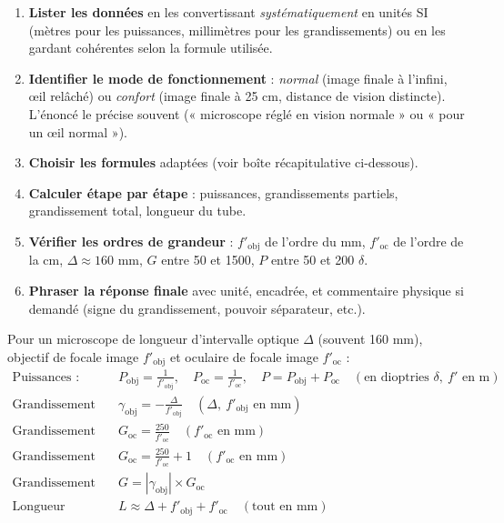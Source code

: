 \documentclass[11pt]{article}
\begin{document}
\begin{methode}
\begin{enumerate}
    \item \textbf{Lister les données} en les convertissant \emph{systématiquement} en unités SI (mètres pour les puissances, millimètres pour les grandissements) ou en les gardant cohérentes selon la formule utilisée.
    \item \textbf{Identifier le mode de fonctionnement} : \emph{normal} (image finale à l'infini, œil relâché) ou \emph{confort} (image finale à 25 cm, distance de vision distincte). L'énoncé le précise souvent (« microscope réglé en vision normale » ou « pour un œil normal »).
    \item \textbf{Choisir les formules} adaptées (voir boîte récapitulative ci-dessous).
    \item \textbf{Calculer étape par étape} : puissances, grandissements partiels, grandissement total, longueur du tube.
    \item \textbf{Vérifier les ordres de grandeur} : $f'_{\text{obj}}$ de l'ordre du mm, $f'_{\text{oc}}$ de l'ordre de la cm, $\Delta \approx 160$ mm, $G$ entre 50 et 1500, $P$ entre 50 et 200 $\delta$.
    \item \textbf{Phraser la réponse finale} avec unité, encadrée, et commentaire physique si demandé (signe du grandissement, pouvoir séparateur, etc.).
\end{enumerate}
\end{methode}

\begin{aretenir}
Pour un microscope de longueur d'intervalle optique $\Delta$ (souvent 160 mm), objectif de focale image $f'_{\text{obj}}$ et oculaire de focale image $f'_{\text{oc}}$ :
\begin{align*}
    \text{Puissances :} \quad & P_{\text{obj}} = \frac{1}{f'_{\text{obj}}},\quad P_{\text{oc}} = \frac{1}{f'_{\text{oc}}},\quad P = P_{\text{obj}} + P_{\text{oc}} \quad (\text{en dioptries } \delta,\ f' \text{ en m}) \\
    \text{Grandissement objectif :} \quad & \gamma_{\text{obj}} = -\frac{\Delta}{f'_{\text{obj}}} \quad (\Delta,\ f'_{\text{obj}} \text{ en mm}) \\
    \text{Grandissement oculaire (normal) :} \quad & G_{\text{oc}} = \frac{250}{f'_{\text{oc}}} \quad (f'_{\text{oc}} \text{ en mm}) \\
    \text{Grandissement oculaire (confort) :} \quad & G_{\text{oc}} = \frac{250}{f'_{\text{oc}}} + 1 \quad (f'_{\text{oc}} \text{ en mm}) \\
    \text{Grandissement commercial :} \quad & G = |\gamma_{\text{obj}}| \times G_{\text{oc}} \\
    \text{Longueur mécanique (approx.) :} \quad & L \approx \Delta + f'_{\text{obj}} + f'_{\text{oc}} \quad (\text{tout en mm})
\end{align*}
\end{aretenir}
\end{document}
